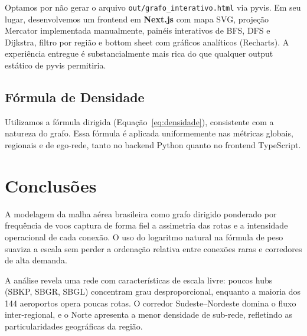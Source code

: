 \documentclass[12pt,a4paper]{article}
\begin{document}
Optamos por não gerar o arquivo \texttt{out/grafo\_interativo.html} via pyvis. Em seu lugar,
desenvolvemos um frontend em \textbf{Next.js} com mapa SVG, projeção Mercator implementada
manualmente, painéis interativos de BFS, DFS e Dijkstra, filtro por região e bottom sheet com
gráficos analíticos (Recharts). A experiência entregue é substancialmente mais rica do que
qualquer output estático de pyvis permitiria.

\subsection{Fórmula de Densidade}

Utilizamos a fórmula dirigida (Equação~\ref{eq:densidade}), consistente com a natureza do grafo.
Essa fórmula é aplicada uniformemente nas métricas globais, regionais e de ego-rede, tanto no
backend Python quanto no frontend TypeScript.

\section{Conclusões}

A modelagem da malha aérea brasileira como grafo dirigido ponderado por frequência de voos captura
de forma fiel a assimetria das rotas e a intensidade operacional de cada conexão. O uso do
logaritmo natural na fórmula de peso suaviza a escala sem perder a ordenação relativa entre
conexões raras e corredores de alta demanda.

A análise revela uma rede com características de escala livre: poucos hubs (SBKP, SBGR, SBGL)
concentram grau desproporcional, enquanto a maioria dos 144 aeroportos opera poucas rotas. O
corredor Sudeste--Nordeste domina o fluxo inter-regional, e o Norte apresenta a menor densidade
de sub-rede, refletindo as particularidades geográficas da região.
\end{document}
